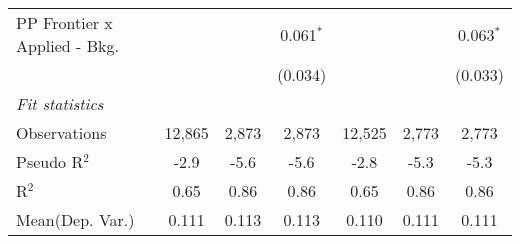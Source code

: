 \begin{tabular}{lcccccc}
   PP Frontier x Applied - Bkg.   &                &              & 0.061$^{*}$ &                &              & 0.063$^{*}$\\   
                                  &                &              & (0.034)     &                &              & (0.033)\\   
   \midrule
   \emph{Fit statistics}\\
   Observations                   & 12,865         & 2,873        & 2,873       & 12,525         & 2,773        & 2,773\\  
   Pseudo R$^2$                   & -2.9           & -5.6         & -5.6        & -2.8           & -5.3         & -5.3\\  
   R$^2$                          & 0.65           & 0.86         & 0.86        & 0.65           & 0.86         & 0.86\\  
Mean(Dep. Var.) & 0.111 & 0.113 & 0.113 & 0.110 & 0.111 & 0.111 \\
   

\end{tabular}

